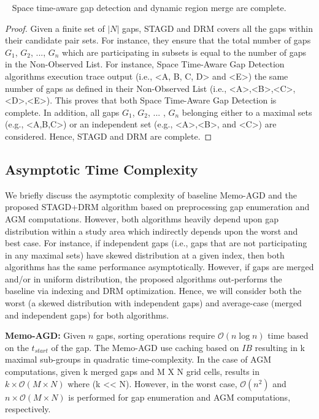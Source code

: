 \documentclass[acmsmall]{acmart}
\begin{document}
\begin{lemma}~\label{lemma:Memo-AGM_complete} 
Space time-aware gap detection and dynamic region merge are complete.
\end{lemma}
\begin{proof}
Given a finite set of $|N|$ gaps, STAGD and DRM covers all the gaps within their candidate pair sets. For instance, they ensure that the total number of gaps $G_{1}$, $G_{2}$, ..., $G_{n}$ which are participating in subsets is equal to the number of gaps in the Non-Observed List. For instance, Space Time-Aware Gap Detection algorithms execution trace output (i.e., <A, B, C, D> and <E>) the same number of gaps as defined in their Non-Observed List (i.e., <A>,<B>,<C>,<D>,<E>). This proves that both Space Time-Aware Gap Detection is complete. In addition, all gaps $G_{1}$, $G_{2}$, ... , $G_{n}$ belonging either to a maximal sets (e.g., <A,B,C>) or an independent set (e.g., <A>,<B>, and <C>) are considered. Hence, STAGD and DRM are complete.
\end{proof}
\subsection{Asymptotic Time Complexity}
\label{subsection:TimeComplexity}
We briefly discuss the asymptotic complexity of baseline Memo-AGD and the proposed STAGD+DRM algorithm based on preprocessing gap enumeration and AGM computations. However, both algorithms heavily depend upon gap distribution within a study area which indirectly depends upon the worst and best case. For instance, if independent gaps (i.e., gaps that are not participating in any maximal sets) have skewed distribution at a given index, then both algorithms has the same performance asymptotically. However, if gaps are merged and/or in uniform distribution, the proposed algorithms out-performs the baseline via indexing and DRM optimization. Hence, we will consider both the worst (a skewed distribution with independent gaps) and average-case (merged and independent gaps) for both algorithms.   

\textbf{Memo-AGD:} Given $n$ gaps, sorting operations require $\mathcal{O}(n\log{}n)$ time based on the $t_{start}$ of the gap. The Memo-AGD use caching based on $IB$ resulting in k maximal sub-groups in quadratic time-complexity. In the case of AGM computations, given k merged gaps and M X N grid cells, results in $k \times \mathcal{O}(M \times N)$ where (k << N). However, in the worst case, $\mathcal{O}(n^{2})$ and $n \times \mathcal{O}(M \times N)$ is performed for gap enumeration and AGM computations, respectively. 
\end{document}
